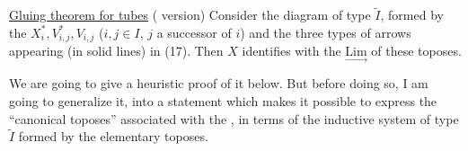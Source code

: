 \uline{Gluing theorem for tubes} ( version) Consider the diagram of type $\widetilde I$, formed by the $X_i^*,V_{i,j}^*,V_{i,j}$ ($i,j\in I$, $j$ a successor of $i$) and the three types of arrows appearing  (in solid lines) in (17). Then $X$ identifies with the   $\underset{\longrightarrow}{\mathrm{Lim}}$ of these toposes.



We are going to give a heuristic proof of it below. But before doing so, I am going to generalize it, into a statement which makes it possible to express  the ``canonical toposes'' associated with the , in terms of the inductive system of type $\widetilde I$ formed by the elementary toposes.

